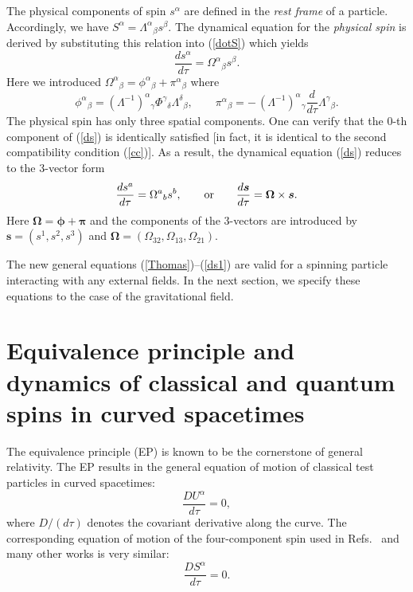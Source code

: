 \documentclass[preprint,showpacs,preprintnumbers,amsmath,amssymb]{revtex4}
\begin{document}
The physical components of spin $s^\alpha$ are defined in the {\it rest frame}
of a particle. Accordingly, we have $S^\alpha = \Lambda^\alpha{}_\beta s^\beta$.
The dynamical equation for the {\it physical spin} is derived by substituting
this relation into (\ref{dotS}) which yields
\begin{equation}
{\frac {ds^\alpha}{d\tau}} = \Omega^\alpha{}_\beta s^\beta.\label{ds}
\end{equation}
Here we introduced $\Omega^\alpha{}_\beta = \phi^\alpha{}_\beta +
\pi^\alpha{}_\beta$ where
\begin{equation}
\phi^\alpha{}_\beta = (\Lambda^{-1})^\alpha
{}_\gamma\Phi^\gamma{}_\delta\Lambda^\delta{}_\beta,\qquad
\pi^\alpha{}_\beta = -\,(\Lambda^{-1})^\alpha{}_\gamma{\frac d {d\tau}}
\Lambda^\gamma{}_\beta.\label{Thomas}
\end{equation}
The physical spin has only three spatial components. One can verify that
the 0-th component of (\ref{ds}) is identically satisfied [in fact, it is
identical to the second compatibility condition (\ref{cc})]. As a result,
the dynamical equation (\ref{ds}) reduces to the 3-vector form
\begin{equation}
{\frac {ds^a}{d\tau}} = \Omega^a{}_b s^b,\qquad {\rm or}\qquad
{\frac {d{\bm s}}{d\tau}} = {\bm \Omega}\times{\bm s}.\label{ds1}
\end{equation}
Here ${\bm \Omega} = {\bm \phi} + {\bm \pi}$ and the components
of the 3-vectors are introduced by ${\bm s} = (s^1, s^2, s^3)$
and ${\bm \Omega} = (\Omega_{32}, \Omega_{13}, \Omega_{21})$.

The new general equations (\ref{Thomas})--(\ref{ds1}) are valid for
a spinning particle interacting with any external fields. In the next
section, we specify these equations to the case of the gravitational field.

\section{Equivalence principle and dynamics of classical and quantum spins
in curved spacetimes}\label{EP}

The equivalence principle (EP) is known to be the cornerstone of
general relativity. The EP results in the general equation of motion
of classical test particles in curved spacetimes:
\begin{equation}
{\frac{DU^\alpha}{d\tau}} = 0,\label{MPA1}
\end{equation}
where $D/(d\tau)$ denotes the covariant derivative along the curve.
The corresponding equation of motion of the four-component spin used
in Refs.~\cite{PK,Dvornikov} and many other works is very similar:
\begin{equation}
{\frac{DS^\alpha}{d\tau}}=0.\label{eqPK}
\end{equation}
\end{document}
